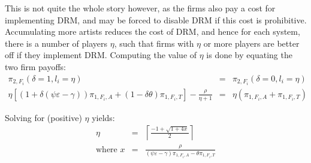 \documentclass[a4paper,12pt]{article}
\numberwithin{equation}{section}
\newcommand{\firmpayoff}[2]{\pi_{{#1}, F_{#2}}}
\newcommand{\firmalbum}[2]{\pi_{#1, F_{#2}, A}}
\newcommand{\firmticket}[2]{\pi_{#1, F_{#2}, T}}
\newcommand{\drminf}{(\psi \varepsilon - \gamma)}
\def\lc{\left\lceil}
\def\rc{\right\rceil}
\begin{document}
This is not quite the whole story however, as the firms also pay a cost for implementing DRM, and may be forced to disable DRM if this cost is prohibitive. Accumulating more artists reduces the cost of DRM, and hence for each system, there is a number of players $\eta$, such that firms with $\eta$ or more players are better off if they implement DRM. Computing the value of $\eta$ is done by equating the two firm payoffs:
\begin{eqnarray*}
\firmpayoff{2}{i}(\delta = 1, l_i = \eta) & = & \firmpayoff{2}{i}(\delta = 0, l_i = \eta)\\
\eta \left[\left(1 + \delta \drminf\right) \firmalbum{1}{i} + (1 - \delta \theta) \firmticket{1}{i}\right] - \frac{\rho}{\eta + 1} & = & \eta (\firmalbum{1}{i} + \firmticket{1}{i})
\end{eqnarray*}

Solving for (positive) $\eta$ yields:
\begin{eqnarray}
\eta & = & \lc \frac{-1 + \sqrt{1 + 4 x}}{2} \rc \\
\text{where } x & = & \frac{\rho}{\drminf \firmalbum{1}{i} - \theta \firmticket{1}{i}} \nonumber
\end{eqnarray}
\end{document}
